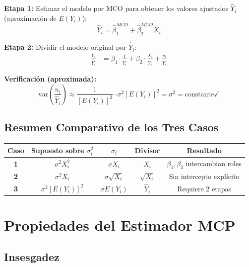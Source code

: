 \documentclass[12pt,a4paper]{article}
\begin{document}
\textbf{Etapa 1:} Estimar el modelo por MCO para obtener los valores ajustados $\hat{Y}_i$ (aproximación de $E(Y_i)$):
\begin{equation}
\hat{Y}_i = \hat{\beta}_1^{MCO} + \hat{\beta}_2^{MCO} X_i
\end{equation}

\textbf{Etapa 2:} Dividir el modelo original por $\hat{Y}_i$:
\begin{align}
\frac{Y_i}{\hat{Y}_i} &= \beta_1 \cdot \frac{1}{\hat{Y}_i} + \beta_2 \cdot \frac{X_i}{\hat{Y}_i} + \frac{u_i}{\hat{Y}_i}
\end{align}

\textbf{Verificación (aproximada):}
\begin{equation}
\text{var}\left(\frac{u_i}{\hat{Y}_i}\right) \approx \frac{1}{[E(Y_i)]^2} \cdot \sigma^2[E(Y_i)]^2 = \sigma^2 = \text{constante} \checkmark
\end{equation}

\subsection{Resumen Comparativo de los Tres Casos}

\begin{center}
\renewcommand{\arraystretch}{2.2}
\begin{tabular}{>{\bfseries}c c c c c}
\toprule
\textbf{Caso} & \textbf{Supuesto sobre $\sigma_i^2$} & \textbf{$\sigma_i$} & \textbf{Divisor} & \textbf{Resultado} \\
\midrule
1 & $\sigma^2 X_i^2$ & $\sigma X_i$ & $X_i$ & $\beta_1,\beta_2$ intercambian roles \\
2 & $\sigma^2 X_i$ & $\sigma\sqrt{X_i}$ & $\sqrt{X_i}$ & Sin intercepto explícito \\
3 & $\sigma^2[E(Y_i)]^2$ & $\sigma E(Y_i)$ & $\hat{Y}_i$ & Requiere 2 etapas \\
\bottomrule
\end{tabular}
\end{center}

\section{Propiedades del Estimador MCP}

\subsection{Insesgadez}
\end{document}
